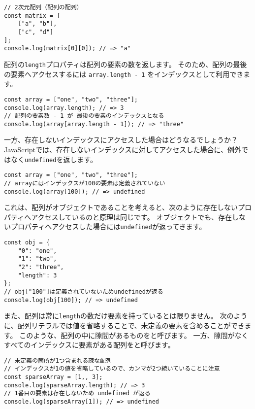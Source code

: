 \begin{lstlisting}
// 2次元配列（配列の配列）
const matrix = [
    ["a", "b"],
    ["c", "d"]
];
console.log(matrix[0][0]); // => "a"
\end{lstlisting}

配列の\texttt{length}プロパティは配列の要素の数を返します。
そのため、配列の最後の要素へアクセスするには
\texttt{array.length - 1}
をインデックスとして利用できます。

\begin{lstlisting}
const array = ["one", "two", "three"];
console.log(array.length); // => 3
// 配列の要素数 - 1 が 最後の要素のインデックスとなる
console.log(array[array.length - 1]); // => "three"
\end{lstlisting}

一方、存在しないインデックスにアクセスした場合はどうなるでしょうか？　JavaScriptでは、存在しないインデックスに対してアクセスした場合に、例外ではなく\texttt{undefined}を返します。

\begin{lstlisting}
const array = ["one", "two", "three"];
// arrayにはインデックスが100の要素は定義されていない
console.log(array[100]); // => undefined
\end{lstlisting}

これは、配列がオブジェクトであることを考えると、次のように存在しないプロパティへアクセスしているのと原理は同じです。
オブジェクトでも、存在しないプロパティへアクセスした場合には\texttt{undefined}が返ってきます。

\begin{lstlisting}
const obj = {
    "0": "one",
    "1": "two",
    "2": "three",
    "length": 3
};
// obj["100"]は定義されていないためundefinedが返る
console.log(obj[100]); // => undefined
\end{lstlisting}

また、配列は常に\texttt{length}の数だけ要素を持っているとは限りません。
次のように、配列リテラルでは値を省略することで、未定義の要素を含めることができます。
このような、配列の中に隙間があるものを\textbf{}と呼びます。
一方、隙間がなくすべてのインデックスに要素がある配列を\textbf{}と呼びます。

\begin{lstlisting}
// 未定義の箇所が1つ含まれる疎な配列
// インデックスが1の値を省略しているので、カンマが2つ続いていることに注意
const sparseArray = [1,, 3];
console.log(sparseArray.length); // => 3 
// 1番目の要素は存在しないため undefined が返る
console.log(sparseArray[1]); // => undefined
\end{lstlisting}

